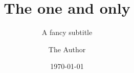 %
%
%


    \title{The one and only}

    \subtitle{A fancy subtitle}

    \author{The Author}
    \date{\today}

